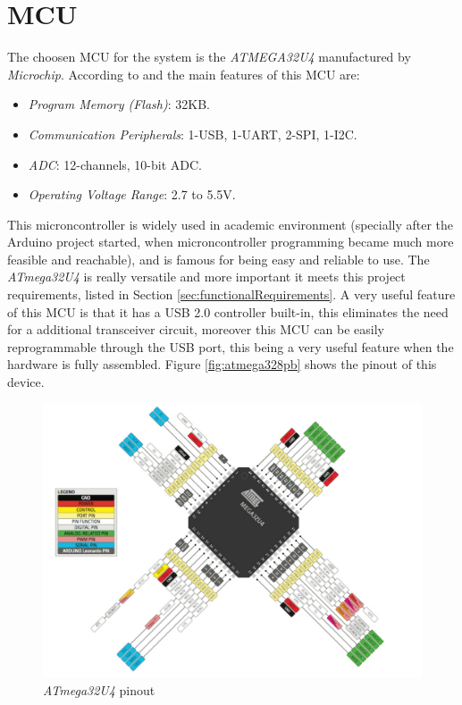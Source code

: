 \section{MCU}\label{sec:mcu-hw}

	The choosen MCU for the system is the \textit{ATMEGA32U4} manufactured by \textit{Microchip}. According to \cite{atmega32u4-features} and \cite{atmega32u4-datasheet} the main features of this MCU are:
		\begin{itemize}
			\item{\textit{Program Memory (Flash)}}: 32KB.\label{itm:program-memory-flash}
			\item{\textit{Communication Peripherals}}: 1-USB, 1-UART, 2-SPI, 1-I2C.\label{itm:communication-peripherals}
			\item{\textit{ADC}}: 12-channels, 10-bit ADC.\label{itm:hw-mcu-adc}
			\item{\textit{Operating Voltage Range}}: 2.7 to 5.5V.\label{itm:operating-voltage-range}
		\end{itemize}
	\par
	This microncontroller is widely used in academic environment (specially after the Arduino project started, when microncontroller programming became much more feasible and reachable), and is famous for being easy and reliable to use. The \textit{ATmega32U4} is really versatile and more important it meets this project requirements, listed in Section \ref{sec:functionalRequirements}. A very useful feature of this MCU is that it has a USB 2.0 controller built-in, this eliminates the need for a additional transceiver circuit, moreover this MCU can be easily reprogrammable through the USB port, this being a very useful feature when the hardware is fully assembled. Figure \ref{fig:atmega328pb} shows the pinout of this device.

	\begin{figure}[htbp]
		\centering
		\includegraphics[scale=0.7]{figuras/fig-atmega32u4-pinout.png}
		\caption{\textit{ATmega32U4} pinout \cite{atmega32u4-pinout}}
		\label{fig:atmega32u4-pinout}
	\end{figure}
		

